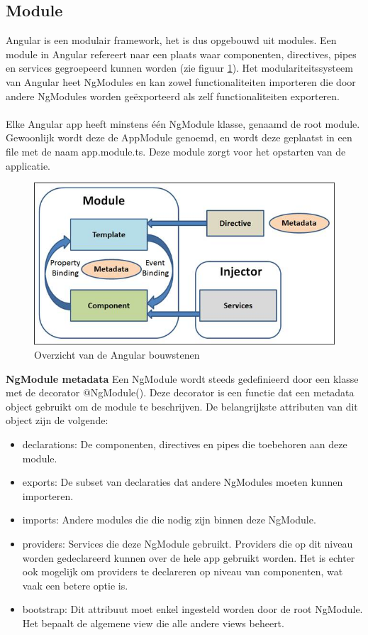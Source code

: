 \subsection{Module}
Angular is een modulair framework, het is dus opgebouwd uit modules. Een module in Angular refereert naar een plaats waar componenten, directives, pipes en services gegroepeerd kunnen worden (zie figuur \ref{fig:Angular-Module-Component}). 
Het modulariteitssysteem van Angular heet NgModules en kan zowel functionaliteiten importeren die door andere NgModules worden geëxporteerd als zelf functionaliteiten exporteren. 
\\ \\
Elke Angular app heeft minstens één NgModule klasse, genaamd de root module. Gewoonlijk wordt deze de AppModule genoemd, en wordt deze geplaatst in een file met de naam app.module.ts. Deze module zorgt voor het opstarten van de applicatie. 

\begin{figure}[H]
	\centering
	\includegraphics[width=0.6\linewidth]{Angular-Module-Component}
	\caption{Overzicht van de Angular bouwstenen \autocite{Trivedi2016}}
	\label{fig:Angular-Module-Component}
\end{figure}

\textbf{NgModule metadata} \hspace{1cm} Een NgModule wordt steeds gedefinieerd door een klasse met de decorator @NgModule(). Deze decorator is een functie dat een metadata object gebruikt om de module te beschrijven. De belangrijkste attributen van dit object zijn de volgende: 
\begin{itemize}
	\item declarations: De componenten, directives en pipes die toebehoren aan deze module.  
	\item exports: De subset van declaraties dat andere NgModules moeten kunnen importeren. 
	\item imports: Andere modules die die nodig zijn binnen deze NgModule. 
	\item providers: Services die deze NgModule gebruikt. Providers die op dit niveau worden gedeclareerd kunnen over de hele app gebruikt worden. Het is echter ook mogelijk om providers te declareren op niveau van componenten, wat vaak een betere optie is.
	\item bootstrap: Dit attribuut moet enkel ingesteld worden door de root NgModule. Het bepaalt de algemene view die alle andere views beheert.
\end{itemize}

